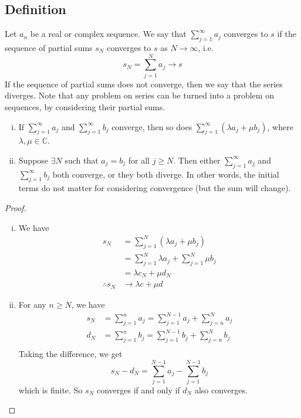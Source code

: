\subsection{Definition}
Let \(a_n\) be a real or complex sequence.
We say that \(\sum_{j=1}^\infty a_j\) converges to \(s\) if the sequence of partial sums \(s_N\) converges to \(s\) as \(N \to \infty\), i.e.
\[
	s_N = \sum_{j=1}^N a_j \to s
\]
If the sequence of partial sums does not converge, then we say that the series diverges.
Note that any problem on series can be turned into a problem on sequences, by considering their partial sums.
\begin{lemma}
	\begin{enumerate}[(i)]
		\item If \(\sum_{j=1}^\infty a_j\) and \(\sum_{j=1}^\infty b_j\) converge, then so does \(\sum_{j=1}^\infty (\lambda a_j + \mu b_j)\), where \(\lambda, \mu \in \mathbb C\).
		\item Suppose \(\exists N\) such that \(a_j = b_j\) for all \(j \geq N\).
		      Then either \(\sum_{j=1}^\infty a_j\) and \(\sum_{j=1}^\infty b_j\) both converge, or they both diverge.
		      In other words, the initial terms do not matter for considering convergence (but the sum will change).
	\end{enumerate}
\end{lemma}
\begin{proof}
	\begin{enumerate}[(i)]
		\item We have
		      \begin{align*}
			      s_N            & = \sum_{j=1}^N (\lambda a_j + \mu b_j)            \\
			                     & = \sum_{j=1}^N \lambda a_j + \sum_{j=1}^N \mu b_j \\
			                     & = \lambda c_N + \mu d_N                           \\
			      \therefore s_N & \to \lambda c + \mu d
		      \end{align*}
		\item For any \(n \geq N\), we have
		      \begin{align*}
			      s_N & = \sum_{j=1}^n a_j = \sum_{j=1}^{N-1} a_j + \sum_{j=n}^N a_j \\
			      d_N & = \sum_{j=1}^n b_j = \sum_{j=1}^{N-1} b_j + \sum_{j=n}^N b_j \\
		      \end{align*}
		      Taking the difference, we get
		      \[
			      s_N - d_N = \sum_{j=1}^{N-1} a_j - \sum_{j=1}^{N-1} b_j
		      \]
		      which is finite.
		      So \(s_N\) converges if and only if \(d_N\) also converges.
	\end{enumerate}
\end{proof}

